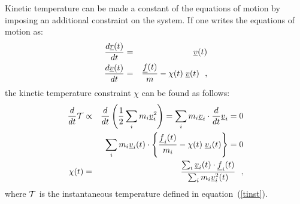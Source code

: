 Kinetic temperature can be made a constant of the equations of
motion by imposing an additional constraint on the system.  If one
writes the equations of motion as:
\begin{eqnarray}
{d \mbox{$\underline{r}$}(t) \over d t} &=& \mbox{$\underline{v}$}(t) \nonumber \\
{d \mbox{$\underline{v}$}(t) \over d t} &=& {\mbox{$\underline{f}$}(t) \over m} - \chi (t) \;
\mbox{$\underline{v}$}(t)~~,
\end{eqnarray}
the kinetic temperature constraint $\chi$ can be found as follows:
\begin{eqnarray}
\frac{d}{dt} {\cal T} &\propto& \frac{d}{dt} \left(\frac{1}{2}\sum_{i} m_{i} \mbox{$\underline{v}$}_{i}^{2} \right) =
\sum_{i} m_{i} \mbox{$\underline{v}$}_{i} \cdot \frac{d}{dt} \mbox{$\underline{v}$}_{i} = 0 \nonumber \\
& & \sum_{i} m_{i} \mbox{$\underline{v}$}_{i}(t) \cdot
\left\{ \frac{\mbox{$\underline{f}$}_{i}(t)}{m_{i}} - \chi (t) \; \mbox{$\underline{v}$}_{i}(t) \right\} = 0 \label{Evans} \\
\chi (t) &=& \frac {\sum_{i} \mbox{$\underline{v}$}_{i}(t) \cdot \mbox{$\underline{f}$}_{i}(t)} {\sum_{i} m_{i} \mbox{$\underline{v}$}_{i}^{2}(t)}~~, \nonumber
\end{eqnarray}
where $\cal T$ is the instantaneous temperature defined in equation~(\ref{tinst}).

